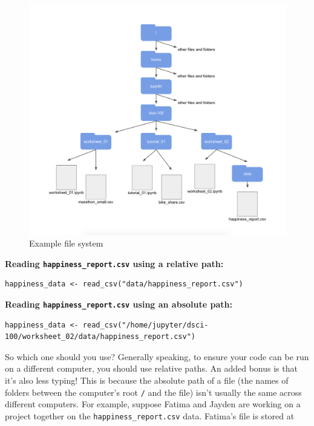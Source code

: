 \documentclass[
]{krantz}
\begin{document}
\begin{figure}
\includegraphics[width=1\linewidth]{img/file-system-for-export-to-intro-datascience} \caption{Example file system}\label{fig:file-system-for-export-to-intro-datascience}
\end{figure}

\textbf{Reading \texttt{happiness\_report.csv} using a relative path:}

\begin{verbatim}
happiness_data <- read_csv("data/happiness_report.csv")
\end{verbatim}

\textbf{Reading \texttt{happiness\_report.csv} using an absolute path:}

\begin{verbatim}
happiness_data <- read_csv("/home/jupyter/dsci-100/worksheet_02/data/happiness_report.csv")
\end{verbatim}

So which one should you use? Generally speaking, to ensure your code can be run
on a different computer, you should use relative paths. An added bonus is that
it's also less typing! This is because the absolute path of a file (the names of
folders between the computer's root \texttt{/} and the file) isn't usually the same
across different computers. For example, suppose Fatima and Jayden are working on a
project together on the \texttt{happiness\_report.csv} data. Fatima's file is stored at
\end{document}
